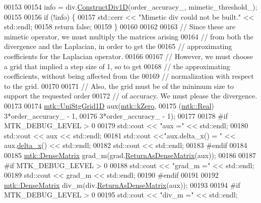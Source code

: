 \begin{DoxyCode}
00153 
00154   info = div.\hyperlink{classmtk_1_1Div1D_a52fcd1542f11e606e36bd188e48bfdf7}{ConstructDiv1D}(order\_accuracy\_, mimetic\_threshold\_);
00155 
00156   \textcolor{keywordflow}{if} (!info) \{
00157     std::cerr << \textcolor{stringliteral}{"Mimetic div could not be built."} << std::endl;
00158     \textcolor{keywordflow}{return} \textcolor{keyword}{false};
00159   \}
00160 
00162 
00163   \textcolor{comment}{// Since these are mimetic operator, we must multiply the matrices arising}
00164   \textcolor{comment}{// from both the divergence and the Laplacian, in order to get the}
00165   \textcolor{comment}{// approximating coefficients for the Laplacian operator.}
00166 
00167   \textcolor{comment}{// However, we must choose a grid that implied a step size of 1, so to get}
00168   \textcolor{comment}{// the approximating coefficients, without being affected from the}
00169   \textcolor{comment}{// normalization with respect to the grid.}
00170 
00171   \textcolor{comment}{// Also, the grid must be of the minimum size to support the requested order}
00172   \textcolor{comment}{// of accuracy. We must please the divergence.}
00173 
00174   \hyperlink{classmtk_1_1UniStgGrid1D}{mtk::UniStgGrid1D} aux(\hyperlink{group__c01-roots_ga59a451a5fae30d59649bcda274fea271}{mtk::kZero},
00175                         (\hyperlink{group__c01-roots_gac080bbbf5cbb5502c9f00405f894857d}{mtk::Real}) 3*order\_accuracy\_ - 1,
00176                         3*order\_accuracy\_ - 1);
00177 
00178 \textcolor{preprocessor}{  #if MTK\_DEBUG\_LEVEL > 0}
00179   std::cout << \textcolor{stringliteral}{"aux ="} << std::endl;
00180   std::cout << aux << std::endl;
00181   std::cout <<\textcolor{stringliteral}{"aux.delta\_x() = "} << aux.\hyperlink{classmtk_1_1UniStgGrid1D_a6e7173b01241632cf509496d66b9f74c}{delta\_x}() << std::endl;
00182   std::cout << std::endl;
00183 \textcolor{preprocessor}{  #endif}
00184 
00185   \hyperlink{classmtk_1_1DenseMatrix}{mtk::DenseMatrix} grad\_m(grad.\hyperlink{classmtk_1_1Grad1D_a77b2eddbe4ab03f469306c604d505b1a}{ReturnAsDenseMatrix}(aux));
00186 
00187 \textcolor{preprocessor}{  #if MTK\_DEBUG\_LEVEL > 0}
00188   std::cout << \textcolor{stringliteral}{"grad\_m ="} << std::endl;
00189   std::cout << grad\_m << std::endl;
00190 \textcolor{preprocessor}{  #endif}
00191 
00192   \hyperlink{classmtk_1_1DenseMatrix}{mtk::DenseMatrix} div\_m(div.\hyperlink{classmtk_1_1Div1D_a213fddbaaf86e4840c6a9649b69c2d49}{ReturnAsDenseMatrix}(aux));
00193 
00194 \textcolor{preprocessor}{  #if MTK\_DEBUG\_LEVEL > 0}
00195   std::cout << \textcolor{stringliteral}{"div\_m ="} << std::endl;

\end{DoxyCode}

